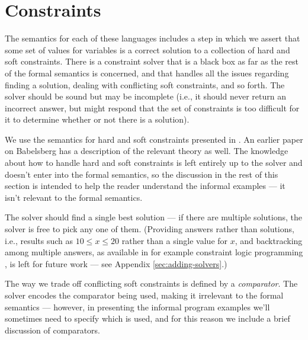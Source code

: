 \documentclass{article}
\newcounter{examples}
\begin{document}
\section{Constraints}
\label{sec:constraints}

The semantics for each of these languages includes a step in which we
assert that some set of values for variables is a correct solution to
a collection of hard and soft constraints.  There is a constraint
solver that is a black box as far as the rest of the formal semantics
is concerned, and that handles all the issues regarding finding a
solution, dealing with conflicting soft constraints, and so forth.
The solver should be sound but may be incomplete (i.e., it should
never return an incorrect answer, but might respond that the set of
constraints is too difficult for it to determine whether or not there
is a solution).

We use the semantics for hard and soft constraints presented in
\cite{borning-lisp-symbolic-computation-1992}.  An earlier paper on
Babelsberg \cite{felgentreff-babelsberg-tr} has a description of the
relevant theory as well.  The knowledge about how to handle hard
and soft constraints is left entirely up to the solver and doesn't
enter into the formal semantics, so the discussion in the rest of this
section is intended to help the reader understand the informal
examples --- it isn't relevant to the formal semantics.

The solver should find a single best solution --- if there are
multiple solutions, the solver is free to pick any one of them.
(Providing answers rather than solutions, i.e., results such as $10
\leq x \leq 20$ rather than a single value for $x$, and backtracking
among multiple answers, as available in for example constraint logic
programming \cite{jaffar-popl-1987}, is left for future work ---
see Appendix \ref{sec:adding-solvers}.)

The way we trade off conflicting soft constraints is defined by a
\emph{comparator}.  The solver encodes the comparator being used,
making it irrelevant to the formal semantics --- however, in
presenting the informal program examples we'll sometimes need to
specify which is used, and for this reason we include a brief
discussion of comparators.
\end{document}
